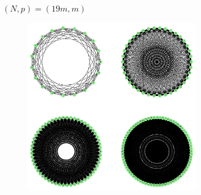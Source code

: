 \begin{frame}{$(N,p)=(19m,m)$}
\begin{figure}
    \begin{center}
        \includegraphics[width=0.65\textwidth]{figs/19.pdf}
    \end{center}
\end{figure}
\end{frame}


